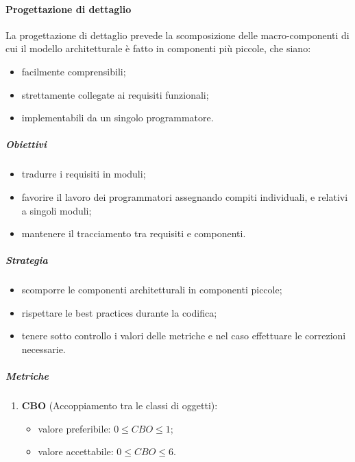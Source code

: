         \paragraph{Progettazione di dettaglio}
            La progettazione di dettaglio prevede la scomposizione delle macro-componenti di cui il modello architetturale è fatto in componenti più piccole, che siano:
            \begin{itemize}
                \item facilmente comprensibili;
                \item strettamente collegate ai requisiti funzionali;
                \item implementabili da un singolo programmatore.
            \end{itemize}
            \subparagraph{Obiettivi}
                \begin{itemize}
                    \item tradurre i requisiti in moduli;
                    \item favorire il lavoro dei programmatori assegnando compiti individuali, e relativi a singoli moduli;
                    \item mantenere il tracciamento tra requisiti e componenti.
                \end{itemize}
            \subparagraph{Strategia}
                \begin{itemize}
                    \item scomporre le componenti architetturali in componenti piccole;
                    \item rispettare le best practices durante la codifica;
                    \item tenere sotto controllo i valori delle metriche e nel caso effettuare le correzioni necessarie.
                \end{itemize}
            \subparagraph{Metriche}
                \begin{enumerate}
                    \item \textbf{CBO} (Accoppiamento tra le classi di oggetti):
                    \begin{itemize}
                        \item valore preferibile: $0 \leq CBO\leq 1$;
                        \item valore accettabile: $0 \leq CBO\leq 6$.
                    \end{itemize}
                \end{enumerate}
